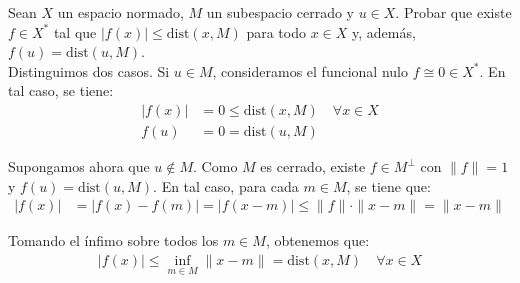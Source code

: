 \begin{ejercicio}
    Sean $X$ un espacio normado, $M$ un subespacio cerrado y $u \in X$. Probar que existe $f \in X^*$ tal que $|f(x)| \leq \mathrm{dist}(x, M)$ para todo $x \in X$ y, además, $f(u) = \mathrm{dist}(u, M)$.\\

    Distinguimos dos casos. Si $u\in M$, consideramos el funcional nulo $f\cong 0\in X^*$. En tal caso, se tiene:
    \begin{align*}
        |f(x)| &= 0\leq \mathrm{dist}(x, M) \quad \forall x \in X\\
        f(u) &= 0 = \mathrm{dist}(u, M)
    \end{align*}

    Supongamos ahora que $u \notin M$. Como $M$ es cerrado, existe $f\in M^\perp$ con $\|f\| = 1$ y $f(u) = \mathrm{dist}(u, M)$. En tal caso, para cada $m\in M$, se tiene que:
    \begin{align*}
        |f(x)| &= |f(x) - f(m)| = |f(x - m)| \leq \|f\| \cdot \|x - m\| = \|x - m\|
    \end{align*}

    Tomando el ínfimo sobre todos los $m \in M$, obtenemos que:
    \begin{align*}
        |f(x)| \leq \inf_{m \in M} \|x - m\| = \mathrm{dist}(x, M) \quad \forall x \in X
    \end{align*}
\end{ejercicio}

